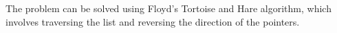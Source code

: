 \documentclass[preview]{standalone}
\begin{document}
The problem can be solved using Floyd’s Tortoise and Hare algorithm, which involves traversing the list and reversing the direction of the pointers.\\
\end{document}
